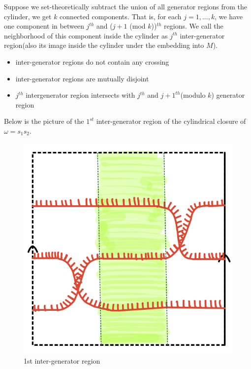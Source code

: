 \begin{definition}
Suppose we set-theoretically subtract the union of all generator regions from the cylinder, we get $k$ connected components. That is, for each $j = 1,...,k$, we have one component in between $j^{th}$ and ($j+1$ (mod $k$))$^{th}$ regions. We call the neighborhood of this component inside the cylinder as  $j^{th}$ inter-generator region(also its image inside the cylinder under the embedding into $M$).

\begin{itemize}
\item inter-generator regions do not contain any crossing
\item inter-generator regions are mutually disjoint
\item $j^{th}$ intergenerator region intersects with $j^{th}$ and $j+1^{th}$(modulo $k$) generator region
\end{itemize}
\end{definition}

Below is the picture of the $1^{st}$ inter-generator region of the cylindrical closure of $\omega = s_1 s_2$.

\begin{figure}[H] 
    \centering
    \includegraphics[scale = 0.95]{diagrams/natural_alternating_diagrams/7-1.png}
    \caption{1st inter-generator region}
    \label{fig:your-label}
\end{figure}

